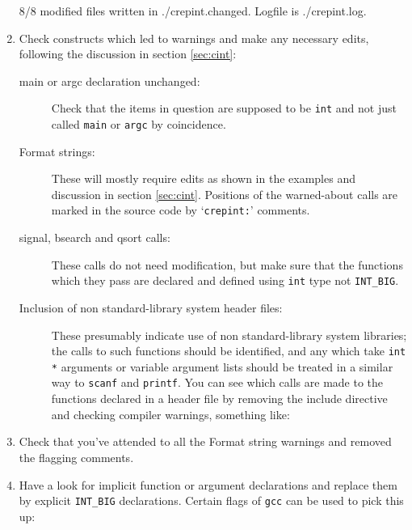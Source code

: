 \documentclass[twoside,11pt,nolof]{starlink}
\providecommand{\file}[1]{\texttt{#1}}
\providecommand{\cc}[1]{\texttt{#1}}
\newenvironment{squote}{\begin{small}}{\end{small}}
\begin{document}
\begin{enumerate}
\begin{squote}
\begin{terminalv}
8/8 modified files written in ./crepint.changed.
Logfile is ./crepint.log.
\end{terminalv}
\end{squote}
%
\item
Check constructs which led to warnings and make any necessary
edits, following the discussion in section \ref{sec:cint}:
\begin{description}
%
\item[main or argc declaration unchanged:]
Check that the items in question are supposed to be \cc{int} and not
just called \cc{main} or \cc{argc} by coincidence.
\item[Format strings:]
These will mostly require edits as shown in the examples
and discussion in section \ref{sec:cint}.
Positions of the warned-about calls are marked in the source code
by `\cc{crepint:}' comments.
%
\item[signal, bsearch and qsort calls:]
These calls do not need modification, but make sure that the functions
which they pass are declared and defined
using \cc{int} type not \cc{INT\_BIG}.
%
\item[Inclusion of non standard-library system header files:]
These presumably indicate use of non standard-library system libraries;
the calls to such functions should be identified, and any which take
\cc{int *} arguments or variable argument lists should be treated in
a similar way to \cc{scanf} and \cc{printf}.
You can see which calls are made to the functions declared in a header file
by removing the include directive and checking compiler warnings,
something like:
\begin{squote}
\begin{terminalv}
\end{terminalv}
\end{squote}
\end{description}
%
\item
Check that you've attended to all the Format string warnings and removed
the flagging comments.
\begin{squote}
\begin{terminalv}
\end{terminalv}
\end{squote}
%
\item
Have a look for implicit function or argument declarations
and replace them by explicit \cc{INT\_BIG} declarations.
Certain flags of \file{gcc} can be used to pick this up:

\end{enumerate}
\end{document}
